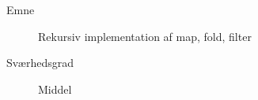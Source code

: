 \begin{description}
\item[Emne] Rekursiv implementation af map, fold, filter
\item[Sværhedsgrad] Middel
\end{description}

